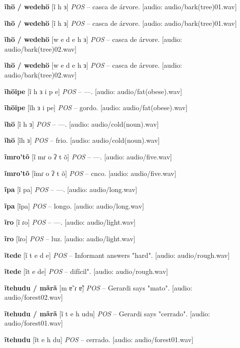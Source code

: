 \textbf{ĩhö / wedehö} [ĩ h ɜ] \textit{POS} -- casca de árvore. [audio: audio/bark(tree)01.wav]{\faHeadphones}

\textbf{ĩhö / wedehö} [ĩ h ɜ] \textit{POS} -- casca de árvore. [audio: audio/bark(tree)01.wav]{\faHeadphones}

\textbf{ĩhö / wedehö} [w e d e h ɜ] \textit{POS} -- casca de árvore. [audio: audio/bark(tree)02.wav]{\faHeadphones}

\textbf{ĩhö / wedehö} [w e d e h ɜ] \textit{POS} -- casca de árvore. [audio: audio/bark(tree)02.wav]{\faHeadphones}

\textbf{ĩhöipe} [ĩ h ɜ i p e] \textit{POS} -- —. [audio: audio/fat(obese).wav]{\faHeadphones}

\textbf{ĩhöipe} [ĩh ɜ i pe] \textit{POS} -- gordo. [audio: audio/fat(obese).wav]{\faHeadphones}

\textbf{ĩhö} [ĩ h ɜ] \textit{POS} -- —. [audio: audio/cold(noun).wav]{\faHeadphones}

\textbf{ĩhö} [ĩh ɜ] \textit{POS} -- frio. [audio: audio/cold(noun).wav]{\faHeadphones}

\textbf{ĩmro'tõ} [ĩ mɾ o ʔ t õ] \textit{POS} -- —. [audio: audio/five.wav]{\faHeadphones}

\textbf{ĩmro'tõ} [ĩmɾ o ʔ t õ] \textit{POS} -- cnco. [audio: audio/five.wav]{\faHeadphones}

\textbf{ĩpa} [ĩ pa] \textit{POS} -- —. [audio: audio/long.wav]{\faHeadphones}

\textbf{ĩpa} [ĩpa] \textit{POS} -- longo. [audio: audio/long.wav]{\faHeadphones}

\textbf{ĩro} [ĩ ɾo] \textit{POS} -- —. [audio: audio/light.wav]{\faHeadphones}

\textbf{ĩro} [ĩɾo] \textit{POS} -- luz. [audio: audio/light.wav]{\faHeadphones}

\textbf{ĩtede} [ĩ t e d e] \textit{POS} -- Informant answers "hard". [audio: audio/rough.wav]{\faHeadphones}

\textbf{ĩtede} [ĩt e de] \textit{POS} -- difícil". [audio: audio/rough.wav]{\faHeadphones}

\textbf{ĩtehudu / mãrã} [m ɐ̃ ɾ ɐ̃] \textit{POS} -- Gerardi says "mato". [audio: audio/forest02.wav]{\faHeadphones}

\textbf{ĩtehudu / mãrã} [ĩ t e h udu] \textit{POS} -- Gerardi says "cerrado". [audio: audio/forest01.wav]{\faHeadphones}

\textbf{ĩtehudu} [ĩt e h du] \textit{POS} -- cerrado. [audio: audio/forest01.wav]{\faHeadphones}

